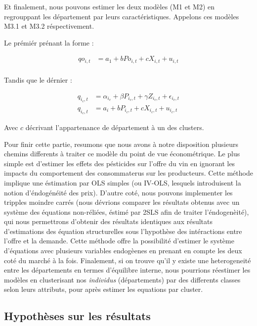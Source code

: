 \documentclass[11pt,]{article}
\begin{document}
Et finalement, nous pouvons estimer les deux modèles (M1 et M2) en
regrouppant les département par leurs caractéristiques. Appelons ces
modèles M3.1 et M3.2 réspectivement.

Le prémiér prénant la forme :

\begin{align*}
  qo_{i,t} & = a_1 + b Po_{i,t} + c X_{i,t} + u_{i,t} \\ 
\end{align*}

Tandis que le dérnier :

\begin{align*}
  q_{i_{c},t} & = \alpha_{i_{c}} + \beta P_{i_{c},t} + \gamma Z_{i_{c},t} + \epsilon_{i_{c},t} \\
  q_{i_{c},t} & = a_i + b P_{i_{c},t} + c X_{i_{c},t} + u_{i_{c},t}
\end{align*}

Avec \(c\) décrivant l'appartenance de département à un des clusters.

Pour finir cette partie, resumons que nous avons à notre disposition
plusieurs chemins differents à traiter ce modèle du point de vue
économétrique. Le plus simple est d'estimer les effets des pésticides
sur l'offre du vin en ignorant les impacts du comportement des
consommaterus sur les producteurs. Cette méthode implique une éstimation
par OLS simples (ou IV-OLS, lesquels introduisent la notion
d'éndogénéité des prix). D'autre coté, nous pouvons implementer les
tripples moindre carrés (nous dévrions comparer les résultats obtenus
avec un système des équations non-réliées, éstimé par 2SLS afin de
traiter l'éndogenèité), qui nous permettrons d'obtenir des résultats
identiques aux résultats d'estimations des équation structurelles sous
l'hypothèse des intéractions entre l'offre et la demande. Cette méthode
offre la possibilité d'estimer le système d'équations avec plusieurs
variables endogèenes en prenant en compte les deux coté du marché à la
fois. Finalement, si on trouve qu'il y existe une heterogeneité entre
les départements en termes d'équilibre interne, nous pourrions réestimer
les modèles en clusterisant nos \emph{individus} (départements) par des
differents classes selon leurs attributs, pour après estimer les
equations par cluster.

\hypertarget{hypotheses-sur-les-resultats}{%
\subsection{Hypothèses sur les
résultats}\label{hypotheses-sur-les-resultats}}
\end{document}
